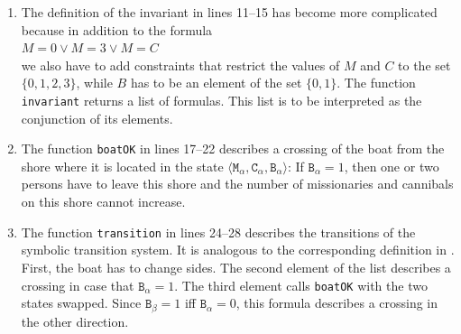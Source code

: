 \begin{enumerate}
      We have to use the function \texttt{And} defined in \texttt{z3.fsx} to form the conjunction of the
      conditions.  This function takes a list of formulas.  The file \texttt{z3.fsx} also provides the
      functions \texttt{Or} and \texttt{Implies}.  The function \texttt{Or} computes the disjunction of a list
      of formulas, while $\texttt{Implies}(A, B)$ represents the formula $A \rightarrow B$.
\item The definition of the invariant in lines 11--15 has become more complicated because in addition to the
      formula 
      \\[0.2cm]
      \hspace*{1.3cm}
      $M = 0 \vee M = 3 \vee M = C$
      \\[0.2cm]
      we also have to add constraints that restrict the values of $M$ and $C$ to the set $\{0, 1, 2, 3\}$,
      while $B$ has to be an element of the set $\{0,1\}$.  The function \texttt{invariant} returns a list of
      formulas.  This list is to be interpreted as the conjunction of its elements.
\item The function \texttt{boatOK} in lines 17--22 describes a crossing of the boat from the shore where it is
      located in the state $\langle \mathtt{M}_\alpha, \mathtt{C}_\alpha, \mathtt{B}_\alpha \rangle$:
      If $\mathtt{B}_\alpha = 1$, then one or two persons have to leave this shore and the number of missionaries
      and cannibals on this shore cannot increase.
\item The function \texttt{transition} in lines 24--28 describes the transitions of the symbolic transition
      system.  It is analogous to the corresponding definition in .  First, the
      boat has to change sides.  The second element of the list describes a crossing in case that
      $\mathtt{B}_\alpha = 1$.  The third element calls \texttt{boatOK} with the two states swapped.  Since
      $\mathtt{B}_\beta = 1$ iff $\mathtt{B}_\alpha = 0$, this formula describes a crossing in the other
      direction.
\end{enumerate}

